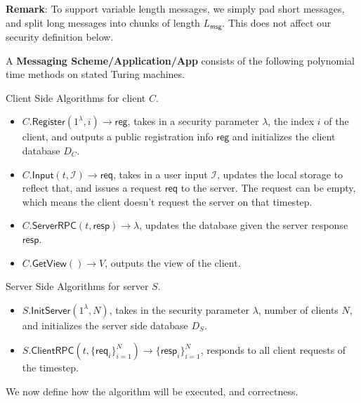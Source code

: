 \documentclass[sigconf, nonacm, balance=false, natbib=false, screen]{acmart}
\newcommand{\msg}{\mathsf{msg}}
\newcommand{\reg}{\mathsf{reg}}
\newcommand{\req}{\mathsf{req}}
\newcommand{\resp}{\mathsf{resp}}
\newcommand{\cI}{\mathcal{I}}
\begin{document}
\textbf{Remark}:  To support variable length messages, we simply pad short messages, and split long messages into chunks of length $L_{\msg}$. This does not affect our security definition below.
\begin{definition}
\label{def:messaging-scheme}
A \textbf{Messaging Scheme/Application/App} consists of the following polynomial time methods on stated Turing machines.

Client Side Algorithms for client $C$.
\begin{itemize}
    \item $C.\mathsf{Register}(1^{\lambda}, i) \to \reg$, takes in a security parameter $\lambda$, the index $i$ of the client, and outputs a public registration info $\reg$ and initializes the client database $D_C$.
    
    \item $C.\mathsf{Input}(t, \cI) \to \req$, takes in a user input $\cI$, updates the local storage to reflect that, and issues a request $\req$ to the server. The request can be empty, which means the client doesn't request the server on that timestep.
    
    \item $C.\mathsf{ServerRPC}(t, \resp)\to \lambda$, updates the database given the server response $\resp$.
    
    \item $C.\mathsf{GetView}() \to V$, outputs the view of the client.
\end{itemize}

Server Side Algorithms for server $S$.

\begin{itemize}
    \item $S.\mathsf{InitServer}(1^{\lambda}, N)$, takes in the security parameter $\lambda$, number of clients $N$, and initializes the server side database $D_S$.
    \item $S.\mathsf{ClientRPC}(t, \{\req_i\}_{i = 1}^N) \to \{\resp_i\}_{i = 1}^N$, responds to all client requests of the timestep.
\end{itemize}
\end{definition}
We now define how the algorithm will be executed, and correctness.
\end{document}
